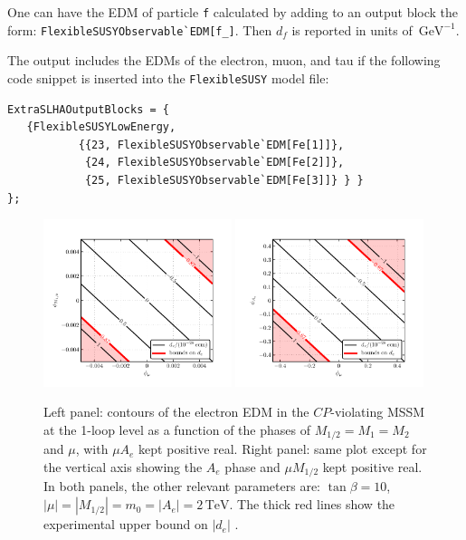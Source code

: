 \documentclass[final,3p,11pt,pdflatex]{elsarticle}
\makeatletter
\newcommand{\fs}{\texttt{FlexibleSUSY}\@\xspace}
\newcommand{\code}[1]{\lstinline|#1|}  %
\newcommand{\unit}[1]{\,\text{#1}}      %
\newcommand{\edm}[1]{\ensuremath{d_{#1}}\xspace}
\newcommand{\CP}{\ensuremath{CP}\xspace}
\newcommand{\mhalf}{\ensuremath{M_{1/2}}\xspace}
\newcommand{\mzero}{\ensuremath{m_0}\xspace}
\makeatother
\begin{document}
One can have the EDM of particle \code{f} calculated
by adding to an output block the form: \code{FlexibleSUSYObservable`EDM[f_]}.
Then $\edm{f}$ is reported in units of $\unit{GeV}^{-1}$.
\begin{example}
The output includes
the EDMs of the electron, muon, and tau if
the following code snippet is inserted into the \fs model file:
\begin{lstlisting}
ExtraSLHAOutputBlocks = {
   {FlexibleSUSYLowEnergy,
           {{23, FlexibleSUSYObservable`EDM[Fe[1]]},
            {24, FlexibleSUSYObservable`EDM[Fe[2]]},
            {25, FlexibleSUSYObservable`EDM[Fe[3]]} } }
};
\end{lstlisting}
\end{example}

\begin{figure}
  \centering
  \includegraphics[width=0.49\textwidth]{doc/plots/MSSMCPV/contour_de_PhiMuM12}\hfill
  \includegraphics[width=0.49\textwidth]{doc/plots/MSSMCPV/contour_de_PhiMuTe}
  \caption{Left panel: contours of the electron EDM in the
    \CP-violating MSSM at the 1-loop level as a function of
    the phases of $\mhalf = M_1 = M_2$ and $\mu$,
    with $\mu A_e$ kept positive real.
    Right panel: same plot except for the vertical axis showing
    the $A_e$ phase and $\mu \mhalf$ kept positive real.
    In both panels, the other relevant parameters are:
    $\tan\beta = 10$, $|\mu| = |\mhalf| = \mzero = |A_e| = 2\unit{TeV}$.
    The thick red lines show the experimental upper bound on $|\edm{e}|$
    \cite{Baron:2013eja}.}
  \label{fig:EDM plots}
\end{figure}
\end{document}
